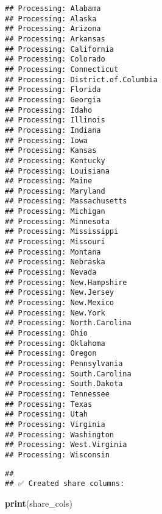 \documentclass[
]{article}
\newenvironment{Shaded}{\begin{snugshade}}{\end{snugshade}}
\newcommand{\AttributeTok}[1]{\textcolor[rgb]{0.13,0.29,0.53}{#1}}
\newcommand{\CommentTok}[1]{\textcolor[rgb]{0.56,0.35,0.01}{\textit{#1}}}
\newcommand{\ConstantTok}[1]{\textcolor[rgb]{0.56,0.35,0.01}{#1}}
\newcommand{\FunctionTok}[1]{\textcolor[rgb]{0.13,0.29,0.53}{\textbf{#1}}}
\newcommand{\NormalTok}[1]{#1}
\newcommand{\OtherTok}[1]{\textcolor[rgb]{0.56,0.35,0.01}{#1}}
\newcommand{\SpecialCharTok}[1]{\textcolor[rgb]{0.81,0.36,0.00}{\textbf{#1}}}
\newcommand{\StringTok}[1]{\textcolor[rgb]{0.31,0.60,0.02}{#1}}
\begin{document}
\begin{verbatim}
## Processing: Alabama 
## Processing: Alaska 
## Processing: Arizona 
## Processing: Arkansas 
## Processing: California 
## Processing: Colorado 
## Processing: Connecticut 
## Processing: District.of.Columbia 
## Processing: Florida 
## Processing: Georgia 
## Processing: Idaho 
## Processing: Illinois 
## Processing: Indiana 
## Processing: Iowa 
## Processing: Kansas 
## Processing: Kentucky 
## Processing: Louisiana 
## Processing: Maine 
## Processing: Maryland 
## Processing: Massachusetts 
## Processing: Michigan 
## Processing: Minnesota 
## Processing: Mississippi 
## Processing: Missouri 
## Processing: Montana 
## Processing: Nebraska 
## Processing: Nevada 
## Processing: New.Hampshire 
## Processing: New.Jersey 
## Processing: New.Mexico 
## Processing: New.York 
## Processing: North.Carolina 
## Processing: Ohio 
## Processing: Oklahoma 
## Processing: Oregon 
## Processing: Pennsylvania 
## Processing: South.Carolina 
## Processing: South.Dakota 
## Processing: Tennessee 
## Processing: Texas 
## Processing: Utah 
## Processing: Virginia 
## Processing: Washington 
## Processing: West.Virginia 
## Processing: Wisconsin
\end{verbatim}

\begin{Shaded}
\end{Shaded}

\begin{verbatim}
## 
## ✅ Created share columns:
\end{verbatim}

\begin{Shaded}
\begin{Highlighting}[]
\FunctionTok{print}\NormalTok{(share\_cols)}
\end{Highlighting}
\end{Shaded}
\end{document}
